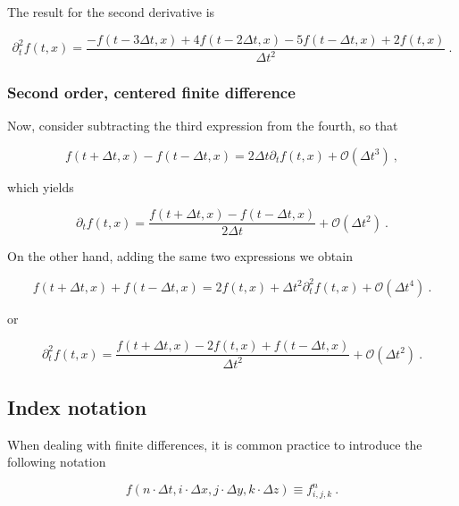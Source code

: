 \documentclass[a4paper,11pt]{article}
\begin{document}
The result for the second derivative is

\begin{equation}
\boxed{\partial_{t}^{2}f(t,x) = \frac{-f(t-3\Delta t,x) + 4f(t-2\Delta t,x) - 5f(t-\Delta t,x) + 2f(t,x)}{\Delta t^{2}}}\ .
\end{equation}

\subsubsection{Second order, centered finite difference}

Now, consider subtracting the third expression from the fourth, so that

\begin{equation}
f(t+\Delta t,x) - f(t-\Delta t,x) = 2 \Delta t \partial_{t}f(t,x) + \mathcal{O}\left(\Delta t^{3}\right)\ ,
\end{equation}

which yields

\begin{equation}
\boxed{\partial_{t}f(t,x) = \frac{f(t+\Delta t,x) - f(t-\Delta t,x)}{2 \Delta t} + \mathcal{O}\left(\Delta t^{2}\right)}\ .
\end{equation}

On the other hand, adding the same two expressions we obtain

\begin{equation}
f(t+\Delta t,x) + f(t-\Delta t,x) =  2f(t,x) + \Delta t^{2}\partial_{t}^{2}f(t,x) + \mathcal{O}\left(\Delta t^{4}\right)\ .
\end{equation}

or

\begin{equation}
\boxed{\partial_{t}^{2}f(t,x) = \frac{f(t+\Delta t,x) - 2f(t,x) + f(t-\Delta t,x)}{\Delta t^{2}} + \mathcal{O}\left(\Delta t^{2}\right)}\ .
\end{equation}

\subsection{Index notation}

When dealing with finite differences, it is common practice to introduce the following notation

\begin{equation}
f\left(n\cdot\Delta t,i\cdot\Delta x,j\cdot\Delta y,k\cdot\Delta z\right) \equiv f^{n}_{i,j,k}\ .
\end{equation}
\end{document}
